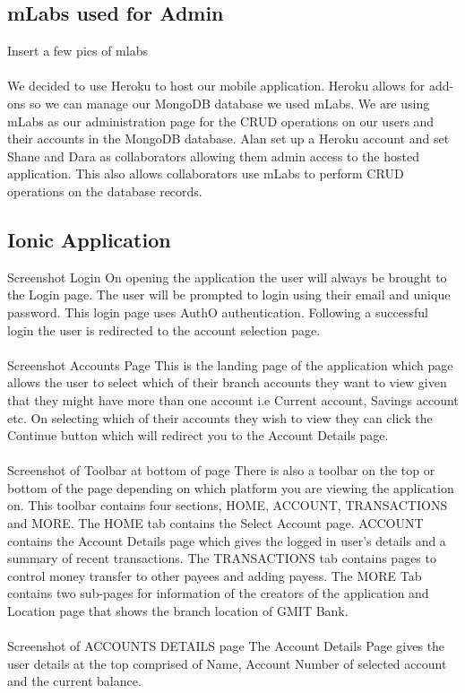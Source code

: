 \subsection{mLabs used for Admin}
Insert a few pics of mlabs\paragraph{}
We decided to use Heroku to host our mobile application. Heroku allows for add-ons so we can manage our MongoDB database we used mLabs. We are using mLabs as our administration page for the CRUD operations on our users and their accounts in the MongoDB database. Alan set up a Heroku account and set Shane and Dara as collaborators allowing them admin access to the hosted application. This also allows collaborators use mLabs to perform CRUD operations on the database records.
\subsection{Ionic Application}
Screenshot Login
On opening the application the user will always be brought to the Login page. The user will be prompted to login using their email and unique password. This login page uses AuthO authentication. Following a successful login the user is redirected to the account selection page.\paragraph{}
Screenshot Accounts Page
 This is the landing page of the application which page allows the user to select which of their branch accounts they want to view given that they might have more than one account i.e Current account, Savings account etc. On selecting which of their accounts they wish to view they can click the Continue button which will redirect you to the Account Details page.\paragraph{}
Screenshot of Toolbar at bottom of page
 There is also a toolbar on the top or bottom of the page depending on which platform you are viewing the application on. This toolbar contains four sections, HOME, ACCOUNT, TRANSACTIONS and MORE. The HOME tab contains the Select Account page. ACCOUNT contains the Account Details page which gives the logged in user’s details and a summary of recent transactions. The TRANSACTIONS tab contains pages to control money transfer to other payees and adding payess. The MORE Tab contains two sub-pages for information of the creators of the application and Location page that shows the branch location of GMIT Bank.\paragraph{}
Screenshot of ACCOUNTS DETAILS page
The Account Details Page gives the user details at the top comprised of Name, Account Number of selected account and the current balance.\paragraph{}

